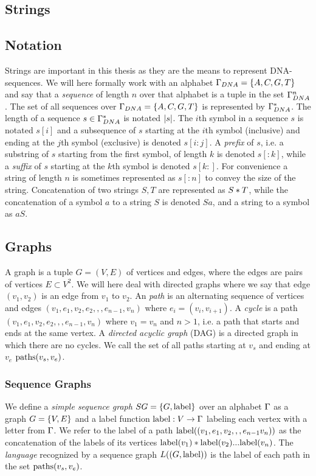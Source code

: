 \subsection{Strings}
\subsection{Notation}
Strings are important in this thesis as they are the means to represent DNA-sequences. We will here formally work with an alphabet $\Gamma_{DNA} = \left\{A, C, G, T\right\}$ and say that a \emph{sequence} of length $n$ over that alphabet is a tuple in the set $\Gamma_{DNA}^n$. The set of all sequences over $\Gamma_{DNA} = \left\{A, C, G, T\right\}$ is  represented by $\Gamma_{DNA}^*$. The length of a sequence $s \in \Gamma_{DNA}^*$ is notated $\left|s\right|$.
The $i$th symbol in a sequence $s$ is notated $s[i]$ and a subsequence of $s$ starting at the $i$th symbol (inclusive) and ending at the $j$th symbol (exclusive) is denoted $s[i:j]$.
A \emph{prefix} of $s$, i.e. a substring of $s$ starting from the first symbol, of length $k$ is denoted $s[:k]$, while a \emph{suffix} of $s$ starting at the $k$th symbol is denoted $s[k:]$.
For convenience a string of length $n$ is sometimes represented as $s[:n]$ to convey the size of the string.
Concatenation of two strings $S, T$ are represented as $S * T$, while the concatenation of a symbol $a$ to a string $S$ is denoted $Sa$, and a string to a symbol as $aS$.

\subsection{Graphs}
A graph is a tuple $G=(V, E)$ of vertices and edges, where the edges are pairs of vertices $E \subset V^2$.
We will here deal with directed graphs where we say that edge $(v_1, v_2)$ is an edge from $v_1$ to $v_2$. An \emph{path} is an alternating sequence of vertices and edges $(v_1, e_1, v_2, e_2,,,e_{n-1}, v_n)$ where $e_i = (v_i, v_{i+1})$.
A \emph{cycle} is a path $(v_1, e_1, v_2, e_2,,,e_{n-1}, v_n)$ where $v_1=v_n$ and $n>1$, i.e. a path that starts and ends at the same vertex. A \emph{directed acyclic graph} (DAG) is a directed graph in which there are no cycles.
We call the set of all paths starting at $v_s$ and ending at $v_e$ $\text{paths}(v_s, v_e)$.

\subsubsection{Sequence Graphs}
We define a \emph{simple sequence graph} $SG = \left\{G, \text{label}\right\}$ over an alphabet $\Gamma$ as a graph $G=\left\{V, E\right\}$ and a label function $\text{label}: V \rightarrow \Gamma$ labeling each vertex with a letter from $\Gamma$. We refer to the label of a path $\text{label}((v_1, e_1, v_2,,,e_{n-1}v_n))$ as the concatenation of the labels of its vertices $\text{label}(v_1)*\text{label}(v_2) ... \text{label}(v_n)$.
The \emph{language} recognized by a sequence graph $L((G, \text{label}))$ is the label of each path in the set $\text{paths}(v_s, v_e)$. 



